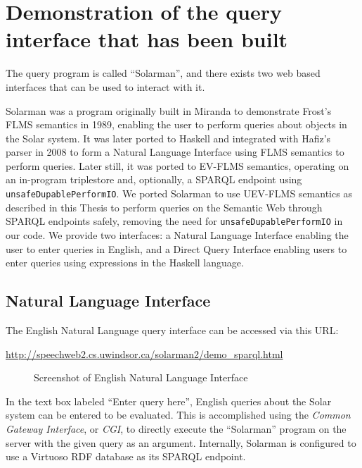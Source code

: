 \documentclass[../main.tex]{subfiles}
\begin{document}
\chapter{Demonstration of the query interface that has been built}
\label{chapter:demonstration}

The query program is called ``Solarman'', and there exists two web based interfaces that can be used to interact with it.

Solarman was a program originally built in Miranda to demonstrate Frost's FLMS semantics in 1989\cite{frost1989constructing}, enabling the user
to perform queries about objects in the Solar system.  It was later ported to Haskell and integrated with Hafiz's parser in 2008\cite{frosthafiz2008}
to form a Natural Language Interface using FLMS semantics to perform queries.  Later still, it was ported to EV-FLMS semantics, operating on an in-program
triplestore and, optionally, a SPARQL endpoint using \texttt{unsafeDupablePerformIO}.  We ported Solarman to use UEV-FLMS semantics as described in this Thesis to perform queries on the Semantic Web through SPARQL endpoints safely, removing the need for \texttt{unsafeDupablePerformIO} in our code.
We provide two interfaces: a Natural Language Interface enabling the user to enter queries in English, and a Direct Query Interface enabling users
to enter queries using expressions in the Haskell language.

\section{Natural Language Interface}

The English Natural Language query interface can be accessed via this URL:

\url{http://speechweb2.cs.uwindsor.ca/solarman2/demo_sparql.html}


\begin{figure}[h]
\centering
{}
\caption{Screenshot of English Natural Language Interface}
\end{figure}
In the text box labeled ``Enter query here'', English queries about the Solar system can be entered to be evaluated.  This is accomplished using the {\em Common Gateway Interface}, or {\em CGI}, to directly execute the ``Solarman'' program on the server with the given query as an argument.  Internally, Solarman is configured to use a Virtuoso\cite{virtuoso} RDF database as its SPARQL endpoint.
\end{document}

